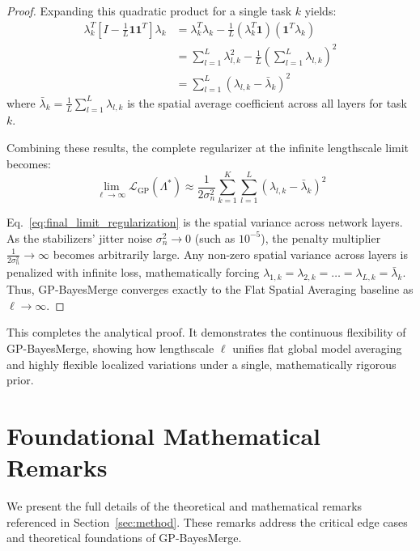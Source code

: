 \documentclass{article}
\theoremstyle{plain}
\theoremstyle{definition}
\theoremstyle{remark}
\begin{document}
\begin{proof}
Expanding this quadratic product for a single task $k$ yields:
\begin{equation}
\begin{aligned}
\lambda_k^T \left[ I - \frac{1}{L} \mathbf{1} \mathbf{1}^T \right] \lambda_k &= \lambda_k^T \lambda_k - \frac{1}{L} (\lambda_k^T \mathbf{1}) (\mathbf{1}^T \lambda_k) \\
&= \sum_{l=1}^L \lambda_{l, k}^2 - \frac{1}{L} \left( \sum_{l=1}^L \lambda_{l, k} \right)^2 \\
&= \sum_{l=1}^L \left( \lambda_{l, k} - \bar{\lambda}_k \right)^2
\end{aligned}
\end{equation}
where $\bar{\lambda}_k = \frac{1}{L} \sum_{l=1}^L \lambda_{l, k}$ is the spatial average coefficient across all layers for task $k$.

Combining these results, the complete regularizer at the infinite lengthscale limit becomes:
\begin{equation}
\lim_{\ell \to \infty} \mathcal{L}_{\text{GP}}(\Lambda^*) \approx \frac{1}{2\sigma_n^2} \sum_{k=1}^K \sum_{l=1}^L \left( \lambda_{l, k} - \bar{\lambda}_k \right)^2
\label{eq:final_limit_regularization}
\end{equation}

Eq.~\ref{eq:final_limit_regularization} is the spatial variance across network layers. As the stabilizers' jitter noise $\sigma_n^2 \to 0$ (such as $10^{-5}$), the penalty multiplier $\frac{1}{2\sigma_n^2} \to \infty$ becomes arbitrarily large. Any non-zero spatial variance across layers is penalized with infinite loss, mathematically forcing $\lambda_{1, k} = \lambda_{2, k} = \dots = \lambda_{L, k} = \bar{\lambda}_k$. Thus, GP-BayesMerge converges exactly to the Flat Spatial Averaging baseline as $\ell \to \infty$.
\end{proof}

This completes the analytical proof. It demonstrates the continuous flexibility of GP-BayesMerge, showing how lengthscale $\ell$ unifies flat global model averaging and highly flexible localized variations under a single, mathematically rigorous prior.

\section{Foundational Mathematical Remarks}
\label{sec:appendix_remarks}

We present the full details of the theoretical and mathematical remarks referenced in Section~\ref{sec:method}. These remarks address the critical edge cases and theoretical foundations of GP-BayesMerge.
\end{document}
